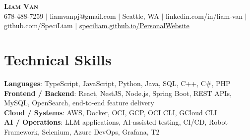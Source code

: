 \documentclass[letterpaper,11pt]{article}
\begin{document}

%
\begin{center}
    \textbf{\Huge \scshape Liam Van} \\ \vspace{1pt}
    \small 678-488-7259 $|$ \small {liamvanpj@gmail.com} $|$ Seattle, WA
 {{$|$ linkedin.com/in/liam-van} {$|$ github.com/SpeciLiam} {$|$ \href{https://speciliam.github.io/PersonalWebsite}{speciliam.github.io/PersonalWebsite}}}

\end{center}

\section{Technical Skills}
 \begin{itemize}[leftmargin=0.15in, label={}]
    \small{\item{
     \textbf{Languages}{: TypeScript, JavaScript, Python, Java, SQL, C++, C\#, PHP} \\
     \textbf{Frontend / Backend}{: React, NestJS, Node.js, Spring Boot, REST APIs, MySQL, OpenSearch, end-to-end feature delivery} \\
     \textbf{Cloud / Systems}{: AWS, Docker, OCI, GCP, OCI CLI, GCloud CLI} \\
     \textbf{AI / Operations}{: LLM applications, AI-assisted testing, CI/CD, Robot Framework, Selenium, Azure DevOps, Grafana, T2} \\
    }}
 \end{itemize}
%
\end{document}
